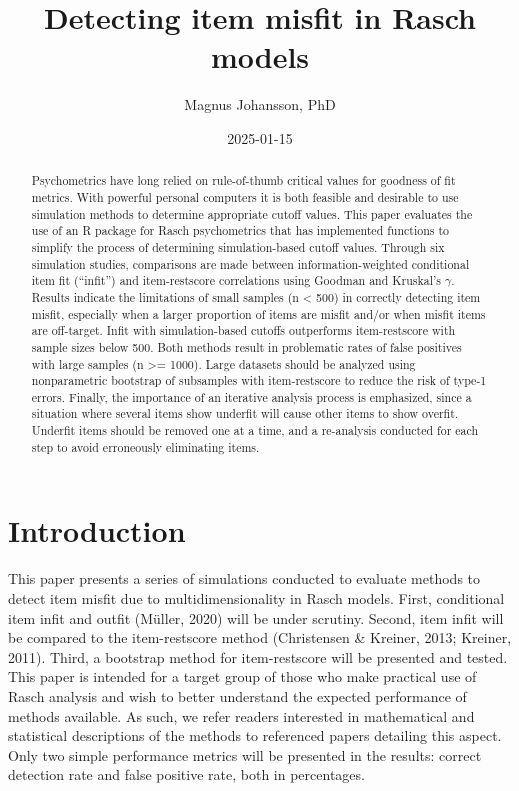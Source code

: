 \documentclass[
  letterpaper,
  DIV=11,
  numbers=noendperiod]{scrartcl}
\title{Detecting item misfit in Rasch models}
\author{Magnus Johansson, PhD}
\date{2025-01-15}
\begin{document}
\maketitle
\begin{abstract}
Psychometrics have long relied on rule-of-thumb critical values for
goodness of fit metrics. With powerful personal computers it is both
feasible and desirable to use simulation methods to determine
appropriate cutoff values. This paper evaluates the use of an R package
for Rasch psychometrics that has implemented functions to simplify the
process of determining simulation-based cutoff values. Through six
simulation studies, comparisons are made between information-weighted
conditional item fit (``infit'') and item-restscore correlations using
Goodman and Kruskal's \(\gamma\). Results indicate the limitations of
small samples (n \textless{} 500) in correctly detecting item misfit,
especially when a larger proportion of items are misfit and/or when
misfit items are off-target. Infit with simulation-based cutoffs
outperforms item-restscore with sample sizes below 500. Both methods
result in problematic rates of false positives with large samples (n
\textgreater= 1000). Large datasets should be analyzed using
nonparametric bootstrap of subsamples with item-restscore to reduce the
risk of type-1 errors. Finally, the importance of an iterative analysis
process is emphasized, since a situation where several items show
underfit will cause other items to show overfit. Underfit items should
be removed one at a time, and a re-analysis conducted for each step to
avoid erroneously eliminating items.
\end{abstract}


\section{Introduction}\label{introduction}

This paper presents a series of simulations conducted to evaluate
methods to detect item misfit due to multidimensionality in Rasch
models. First, conditional item infit and outfit (Müller, 2020) will be
under scrutiny. Second, item infit will be compared to the
item-restscore method (Christensen \& Kreiner, 2013; Kreiner, 2011).
Third, a bootstrap method for item-restscore will be presented and
tested. This paper is intended for a target group of those who make
practical use of Rasch analysis and wish to better understand the
expected performance of methods available. As such, we refer readers
interested in mathematical and statistical descriptions of the methods
to referenced papers detailing this aspect. Only two simple performance
metrics will be presented in the results: correct detection rate and
false positive rate, both in percentages.
\end{document}
